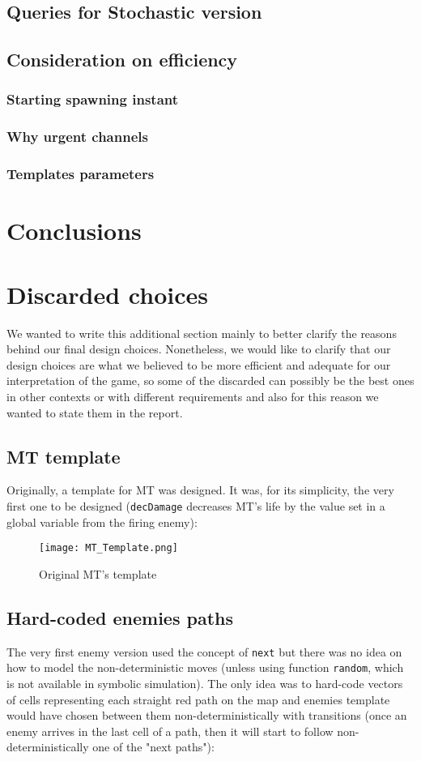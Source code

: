 \documentclass[
10pt, %
a4paper, %
oneside, %
headinclude,footinclude, %
BCOR5mm, %
]{scrartcl}
\begin{document}
	\subsection{Queries for Stochastic version}
	\subsection{Consideration on efficiency}
	\subsubsection{Starting spawning instant}
	\subsubsection{Why urgent channels}
	\subsubsection{Templates parameters}
	
	
	\section{Conclusions}

	\newpage
	\appendix
	\section{Discarded choices}
		We wanted to write this additional section mainly to better clarify the reasons behind our final design choices. Nonetheless, we would like to clarify that our design choices are what we believed to be more efficient and adequate for our interpretation of the game, so some of the discarded can possibly be the best ones in other contexts or with different requirements and also for this reason we wanted to state them in the report.
		\subsection{MT template}
			Originally, a template for MT was designed. It was, for its simplicity, the very first one to be designed (\texttt{decDamage} decreases MT's life by the value set in a global variable from the firing enemy):
			
			\begin{figure}[h!]
				\centering
				\texttt{[image: MT\_Template.png]}
				\caption{Original MT's template}
			\end{figure}
		\subsection{Hard-coded enemies paths}
			The very first enemy version used the concept of \texttt{next} but there was no idea on how to model the non-deterministic moves (unless using function \texttt{random}, which is not available in symbolic simulation). The only idea was to hard-code vectors of cells representing each straight red path on the map and enemies template would have chosen between them non-deterministically with transitions (once an enemy arrives in the last cell of a path, then it will start to follow non-deterministically one of the "next paths"):
			
\end{document}
